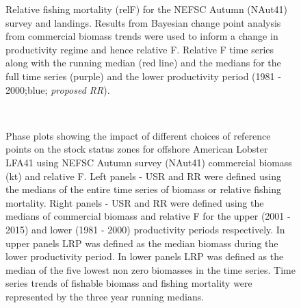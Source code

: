 \documentclass[11pt]{article}
\newcommand{\e}{/backup/bio_data/bio.lobster/figures/} %
\begin{document}
\begin{figure}
\centering
       \caption{Relative fishing mortality (relF) for the NEFSC Autumn (NAut41) survey and landings. Results from Bayesian change point analysis from commercial biomass trends were used to inform a change in productivity regime and hence relative F. Relative F time series along with the running median (red line) and the medians for the full time series (purple) and the lower productivity period (1981 - 2000;blue; \emph{proposed RR}). }
\end{figure}


\begin{landscape}
\begin{figure}
\centering
        \\
      

      \caption{Phase plots showing the impact of different choices of reference points on the stock status zones for offshore American Lobster LFA41 using NEFSC Autumn survey (NAut41) commercial biomass (kt) and relative F. Left panels  - USR and RR were defined using the medians of the entire time series of biomass or relative fishing mortality. Right panels - USR and RR were defined using the medians of commercial biomass and relative F for the upper (2001 - 2015) and lower (1981 - 2000) productivity periods respectively. In upper panels LRP was defined as the median biomass during the lower productivity period. In lower panels LRP was defined as the median of the five lowest non zero biomasses in the time series. Time series trends of fishable biomass and fishing mortality were represented by the three year running medians. }

\end{figure}
\end{landscape}
\end{document}
